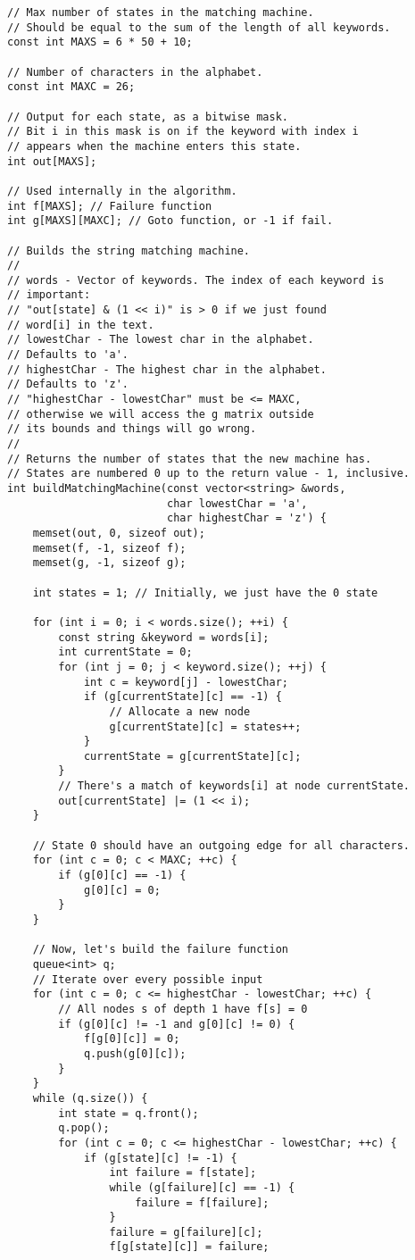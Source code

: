 \documentclass[10pt,letterpaper,twocolumn,twosided]{article}
\begin{document}
\begin{lstlisting}
// Max number of states in the matching machine.
// Should be equal to the sum of the length of all keywords.
const int MAXS = 6 * 50 + 10;

// Number of characters in the alphabet.
const int MAXC = 26;

// Output for each state, as a bitwise mask.
// Bit i in this mask is on if the keyword with index i
// appears when the machine enters this state.
int out[MAXS];

// Used internally in the algorithm.
int f[MAXS]; // Failure function
int g[MAXS][MAXC]; // Goto function, or -1 if fail.

// Builds the string matching machine.
//
// words - Vector of keywords. The index of each keyword is
// important:
// "out[state] & (1 << i)" is > 0 if we just found
// word[i] in the text.
// lowestChar - The lowest char in the alphabet.
// Defaults to 'a'.
// highestChar - The highest char in the alphabet.
// Defaults to 'z'.
// "highestChar - lowestChar" must be <= MAXC,
// otherwise we will access the g matrix outside
// its bounds and things will go wrong.
//
// Returns the number of states that the new machine has.
// States are numbered 0 up to the return value - 1, inclusive.
int buildMatchingMachine(const vector<string> &words,
                         char lowestChar = 'a',
                         char highestChar = 'z') {
    memset(out, 0, sizeof out);
    memset(f, -1, sizeof f);
    memset(g, -1, sizeof g);
    
    int states = 1; // Initially, we just have the 0 state
        
    for (int i = 0; i < words.size(); ++i) {
        const string &keyword = words[i];
        int currentState = 0;
        for (int j = 0; j < keyword.size(); ++j) {
            int c = keyword[j] - lowestChar;
            if (g[currentState][c] == -1) {
                // Allocate a new node
                g[currentState][c] = states++;
            }
            currentState = g[currentState][c];
        }
        // There's a match of keywords[i] at node currentState.
        out[currentState] |= (1 << i);
    }
    
    // State 0 should have an outgoing edge for all characters.
    for (int c = 0; c < MAXC; ++c) {
        if (g[0][c] == -1) {
            g[0][c] = 0;
        }
    }

    // Now, let's build the failure function
    queue<int> q;
    // Iterate over every possible input
    for (int c = 0; c <= highestChar - lowestChar; ++c) {
        // All nodes s of depth 1 have f[s] = 0
        if (g[0][c] != -1 and g[0][c] != 0) {
            f[g[0][c]] = 0;
            q.push(g[0][c]);
        }
    }
    while (q.size()) {
        int state = q.front();
        q.pop();
        for (int c = 0; c <= highestChar - lowestChar; ++c) {
            if (g[state][c] != -1) {
                int failure = f[state];
                while (g[failure][c] == -1) {
                    failure = f[failure];
                }
                failure = g[failure][c];
                f[g[state][c]] = failure;


\end{lstlisting}
\end{document}
